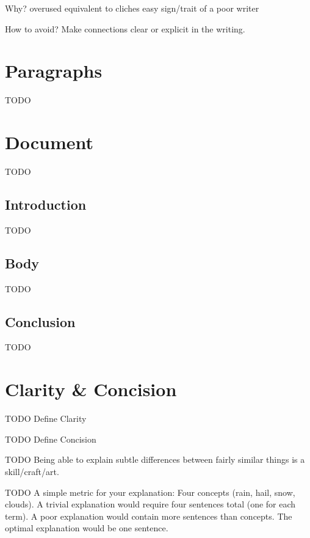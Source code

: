 \documentclass[10pt,a4paper]{book}
\begin{document}
Why?
overused
equivalent to cliches
easy sign/trait of a poor writer

How to avoid?
Make connections clear or explicit in the writing.


\chapter{Paragraphs}

\color{BrickRed}TODO\color{black}


\chapter{Document}

\color{BrickRed}TODO\color{black}


\section{Introduction}

\color{BrickRed}TODO\color{black}


\section{Body}

\color{BrickRed}TODO\color{black}


\section{Conclusion}

\color{BrickRed}TODO\color{black}



\chapter{Clarity \& Concision}

\color{BrickRed}TODO\color{black}
Define Clarity

\color{BrickRed}TODO\color{black}
Define Concision

\color{BrickRed}TODO\color{black}
Being able to explain subtle differences between fairly similar things is a skill/craft/art.

\color{BrickRed}TODO\color{black}
A simple metric for your explanation:
Four concepts (rain, hail, snow, clouds).
A trivial explanation would require four sentences total (one for each term).
A poor explanation would contain more sentences than concepts.
The optimal explanation would be one sentence.
\end{document}
